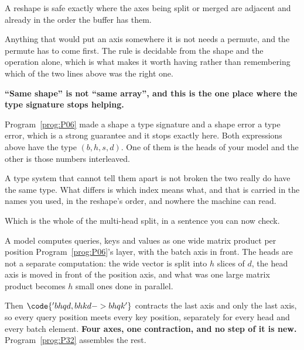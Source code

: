 \begin{fr}
\begin{ansblock}
A reshape is safe exactly where the axes being split or merged are adjacent and
already in the order the buffer has them.
\end{ansblock}

Anything that would put an axis somewhere it is not needs a permute, and the
permute has to come first. The rule is decidable from the shape and the
operation alone, which is what makes it worth having rather than remembering
which of the two lines above was the right one.

\begin{trapbox}
\textbf{\enquote{Same shape} is not \enquote{same array}, and this is the one
place where the type signature stops helping.}

Program~\ref{prog:P06} made a shape a type signature and a shape error a type
error, which is a strong guarantee and it stops exactly here. Both expressions
above have the type $(b, h, s, d) $. One of them is the heads of your model and
the other is those numbers interleaved.

A type system that cannot tell them apart is not broken \dash{} the two really
do have the same type. What differs is which index means what, and that is
carried in the names you used, in the reshape's order, and nowhere the machine
can read.
\end{trapbox}

\begin{aibox}
Which is the whole of the multi-head split, in a sentence you can now check.

A model computes queries, keys and values as one wide matrix product per
position \dash{} Program~\ref{prog:P06}'s layer, with the batch axis in front.
The heads are not a separate computation: the wide vector is split into $h$
slices of $d$, the head axis is moved in front of the position axis, and what
was one large matrix product becomes $h$ small ones done in parallel.

Then $\code{'bhqd,bhkd->bhqk'}$ contracts the last axis and only the last axis,
so every query position meets every key position, separately for every head and
every batch element. \textbf{Four axes, one contraction, and no step of it is
new.} Program~\ref{prog:P32} assembles the rest.
\end{aibox}
\end{fr}

